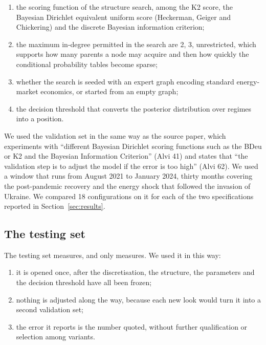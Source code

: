 \documentclass[11pt,a4paper]{article}
\begin{document}
\begin{enumerate}
\item the scoring function of the structure search, among the K2 score, the Bayesian Dirichlet
      equivalent uniform score (Heckerman, Geiger and Chickering) and the discrete Bayesian
      information criterion;
\item the maximum in-degree permitted in the search are 2, 3, unrestricted, which
      supports how many parents a node may acquire and then how quickly the conditional
      probability tables become sparse;
\item whether the search is seeded with an expert graph encoding standard energy-market
      economics, or started from an empty graph;
\item the decision threshold that converts the posterior distribution over regimes into a
      position.
\end{enumerate}

We used the validation set in the same way as the source paper, which experiments with ``different
Bayesian Dirichlet scoring functions such as the BDeu or K2 and the Bayesian Information
Criterion'' (Alvi 41) and states that ``the validation step is to adjust the model if 
the error is too high'' (Alvi 62). We used a window  that runs from August 2021 
to January 2024, thirty months covering the post-pandemic recovery and the energy 
shock that followed the invasion of Ukraine. We compared 18
configurations on it for each of the two specifications reported in
Section~\ref{sec:results}.

\subsection{The testing set}

The testing set measures, and only measures. We used it in this way:

\begin{enumerate}
\item it is opened once, after the discretisation, the structure, the parameters and the decision
      threshold have all been frozen;
\item nothing is adjusted along the way, because each new look would turn it into a second
      validation set;
\item the error it reports is the number quoted, without further qualification or selection among
      variants.
\end{enumerate}
\end{document}
